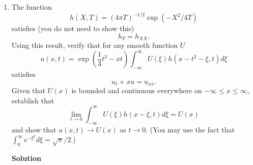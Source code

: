 \documentclass{article}
\begin{document}
\begin{enumerate}
\begin{enumerate}
\item Suppose \(\Omega\) is a smooth set in \(\mathbb{R}^2\) with mirror symmetry about the \(y\) axis, i.e., if \((x,y) \in \Omega\) then \((-x,y) \in \Omega\).  Let \(\phi\) be the eigenfunction for the Dirichlet problem on \(\Omega\) with the smallest eigenvalue.  Use the result in (a) to show that \(\phi(x,y) = \phi(-x,y)\).

\end{enumerate}

{\bf Solution}

\begin{enumerate}
\item Given \(u_1 \in C^1(\Omega_1)\), let \(u_2 \in C(\Omega_2)\) extend \(u_1\) on \(\Omega_2 \backslash \Omega_1\) by defining \(u_2 = 0\) there.  Then \(u_2\) is weakly differentiable, and
\[\int_{\Omega_1} |\nabla u_1|^2 dx = \int_{\Omega_2} |\nabla u_2|^2 dx, \ 
  \int_{\Omega_1} u_1^2 dx = \int_{\Omega_2} u_2^2 dx,\]
hence the Rayleigh Quotients are identical.  Since
\[\lambda_j = -\max_{u = 0 \ \text{on \(\partial\Omega_j\)}} \frac{(\Delta u, u)}{(u, u)}
            = \min_{u = 0 \ \text{on \(\partial\Omega_j\)}} \frac{\int_{\Omega_j} |\nabla u|^2 dx}{\int_{\Omega_j} u^2 dx},\]
we conclude that \(0 < \lambda_2 < \lambda_1\), since the set of admissible functions with \(u = 0\) on \(\Omega_2\) (strictly) contains those with \(u = 0\) on \(\Omega_1\).

\item 

\end{enumerate}



\item The function
\[h(X,T) = (4 \pi T)^{-1/2} \exp \left( -X^2 / 4 T \right)\]
satisfies (you do not need to show this)
\[h_T = h_{XX}.\]
Using this result, verify that for any smooth function \(U\)
\[u(x,t) = \exp \left( \frac{1}{3} t^3 - x t \right) \int_{-\infty}^{\infty} U(\xi) h(x - t^2 - \xi, t) d\xi\]
satisfies
\[u_t + x u = u_{xx}.\]
Given that \(U(x)\) is bounded and continuous everywhere on \(-\infty \leq x \leq \infty\), establish that
\[\lim_{t \to 0} \int_{-\infty}^{\infty} U(\xi) h(x - \xi, t) d\xi = U(x)\]
and show that \(u(x,t) \to U(x)\) as \(t \to 0\).  (You may use the fact that \(\int_0^{\infty} e^{-\xi^2} d\xi = \sqrt{\pi}/2\).)

{\bf Solution}


\end{enumerate}
\end{document}
